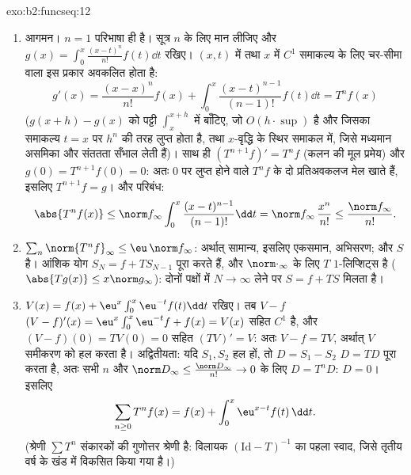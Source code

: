 \begin{solution}{exo:b2:funcseq:12}
\begin{enumerate}
  \item आगमन। $n = 1$ परिभाषा ही है। सूत्र $n$ के लिए मान लीजिए और $g(x) = \int_0^x \frac{(x-t)^n}{n!}
        f(t)\dd t$
        रखिए। $(x,t)$ में  तथा $x$ में $C^1$ समाकल्य के लिए चर-सीमा वाला
         इस प्रकार अवकलित होता है:
        \[
        g'(x) = \frac{(x-x)^n}{n!}f(x)
        + \int_0^x \frac{(x-t)^{n-1}}{(n-1)!}f(t)\dd t
        = T^nf(x)
        \]
        ($g(x+h) - g(x)$ को पट्टी $\int_x^{x+h}$ में बाँटिए, जो $O(h\cdot\sup)$ है और जिसका समाकल्य $t = x$
        पर $h^n$ की तरह लुप्त होता है, तथा $x$-वृद्धि के स्थिर समाकल
        में, जिसे मध्यमान असमिका और संततता सँभाल लेती हैं)। साथ ही $(T^{n+1}f)' = T^nf$
        (कलन की मूल प्रमेय) और $g(0) =
        T^{n+1}f(0) = 0$: अतः $0$ पर लुप्त होने वाले $T^nf$ के
        दो प्रतिअवकलज मेल खाते हैं, इसलिए $T^{n+1}f = g$। और परिबंध:
        \[
        \abs{T^nf(x)} \leq \norm f_\infty
        \int_0^x \frac{(x-t)^{n-1}}{(n-1)!}\dd t
        = \norm f_\infty\,\frac{x^n}{n!}
        \leq \frac{\norm f_\infty}{n!} .
        \]
  \item $\sum_n \norm{T^nf}_\infty \leq \eu\,\norm f_\infty$: अर्थात् सामान्य, इसलिए एकसमान, अभिसरण; और $S$  है।
        आंशिक योग $S_N = f + T S_{N-1}$ पूरा करते हैं, और $\norm\cdot_\infty$ के लिए $T$ $1$-लिप्शिट्स
        है ($\abs{Tg(x)} \leq x\norm g_\infty$): दोनों पक्षों में $N \to
        \infty$ लेने पर $S = f + TS$ मिलता है।
  \item $V(x) = f(x) + \eu^x\int_0^x \eu^{-t}f(t)\dd t$ रखिए। तब $V - f$ $(V-f)'(x) =
        \eu^x\int_0^x\eu^{-t}f + f(x) = V(x)$ सहित $C^1$ है, और $(V - f)(0) = TV(0) = 0$ सहित $(TV)' = V$: अतः
        $V - f = TV$, अर्थात् $V$ समीकरण को हल करता है। अद्वितीयता: यदि $S_1, S_2$
         हल हों, तो $D = S_1 - S_2$ $D =
        TD$ पूरा करता है, अतः सभी $n$ और $\norm D_\infty
        \leq \frac{\norm D_\infty}{n!} \to 0$ के
        लिए $D = T^nD$: $D = 0$। इसलिए
        \[
        \sum_{n\geq0} T^nf(x) = f(x) +
        \int_0^x \eu^{x-t}f(t)\,\dd t .
        \]
        (श्रेणी $\sum T^n$ संकारकों की गुणोत्तर श्रेणी है: विलायक $(\mathrm{Id} - T)^{-1}$ का पहला
        स्वाद, जिसे तृतीय वर्ष के खंड में विकसित किया गया है।)
\end{enumerate}
\end{solution}


